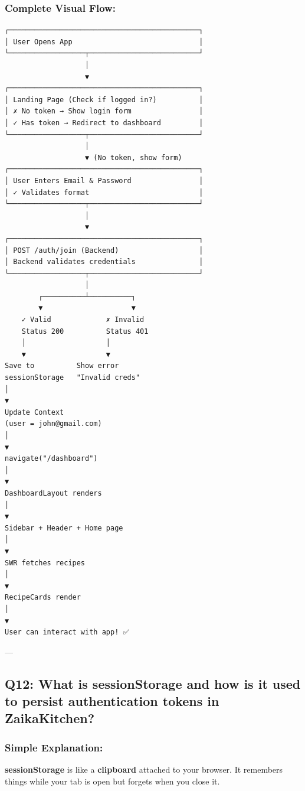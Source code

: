 \documentclass[12pt]{article}
\begin{document}
\subsubsection*{Complete Visual Flow:}

\begin{center}
\begin{lstlisting}
┌─────────────────────────────────────────────┐
│ User Opens App                              │
└──────────────────┬──────────────────────────┘
                   │
                   ▼
┌─────────────────────────────────────────────┐
│ Landing Page (Check if logged in?)          │
│ ✗ No token → Show login form                │
│ ✓ Has token → Redirect to dashboard         │
└──────────────────┬──────────────────────────┘
                   │
                   ▼ (No token, show form)
┌─────────────────────────────────────────────┐
│ User Enters Email & Password                │
│ ✓ Validates format                          │
└──────────────────┬──────────────────────────┘
                   │
                   ▼
┌─────────────────────────────────────────────┐
│ POST /auth/join (Backend)                   │
│ Backend validates credentials               │
└──────────────────┬──────────────────────────┘
                   │
        ┌──────────┴──────────┐
        ▼                     ▼
    ✓ Valid             ✗ Invalid
    Status 200          Status 401
    │                   │
    ▼                   ▼
Save to          Show error
sessionStorage   "Invalid creds"
│
▼
Update Context
(user = john@gmail.com)
│
▼
navigate("/dashboard")
│
▼
DashboardLayout renders
│
▼
Sidebar + Header + Home page
│
▼
SWR fetches recipes
│
▼
RecipeCards render
│
▼
User can interact with app! ✅
\end{lstlisting}
\end{center}

---

\subsection{Q12: What is sessionStorage and how is it used to persist authentication tokens in ZaikaKitchen?}

\subsubsection*{Simple Explanation:}

\textbf{sessionStorage} is like a \textbf{clipboard} attached to your browser. It remembers things while your tab is open but forgets when you close it.
\end{document}

